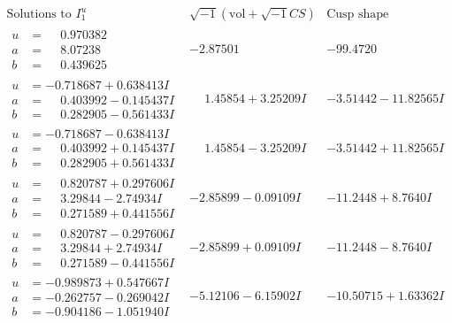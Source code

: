 \documentclass[1p]{elsarticle_modified}
\theoremstyle{definition}
\newcommand{\I}{\sqrt{-1}}
\begin{document}
$$\begin{array}{c|c|c}  
\text{Solutions to }I^u_{1}& \I (\text{vol} + \sqrt{-1}CS) & \text{Cusp shape}\\
 \hline 
\begin{aligned}
u &= \phantom{-}0.970382\phantom{ +0.000000I} \\
a &= \phantom{-}8.07238\phantom{ +0.000000I} \\
b &= \phantom{-}0.439625\phantom{ +0.000000I}\end{aligned}
 & -2.87501\phantom{ +0.000000I} & -99.4720\phantom{ +0.000000I} \\ \hline\begin{aligned}
u &= -0.718687 + 0.638413 I \\
a &= \phantom{-}0.403992 - 0.145437 I \\
b &= \phantom{-}0.282905 - 0.561433 I\end{aligned}
 & \phantom{-}1.45854 + 3.25209 I & -3.51442 - 11.82565 I \\ \hline\begin{aligned}
u &= -0.718687 - 0.638413 I \\
a &= \phantom{-}0.403992 + 0.145437 I \\
b &= \phantom{-}0.282905 + 0.561433 I\end{aligned}
 & \phantom{-}1.45854 - 3.25209 I & -3.51442 + 11.82565 I \\ \hline\begin{aligned}
u &= \phantom{-}0.820787 + 0.297606 I \\
a &= \phantom{-}3.29844 - 2.74934 I \\
b &= \phantom{-}0.271589 + 0.441556 I\end{aligned}
 & -2.85899 - 0.09109 I & -11.2448 + 8.7640 I \\ \hline\begin{aligned}
u &= \phantom{-}0.820787 - 0.297606 I \\
a &= \phantom{-}3.29844 + 2.74934 I \\
b &= \phantom{-}0.271589 - 0.441556 I\end{aligned}
 & -2.85899 + 0.09109 I & -11.2448 - 8.7640 I \\ \hline\begin{aligned}
u &= -0.989873 + 0.547667 I \\
a &= -0.262757 - 0.269042 I \\
b &= -0.904186 - 1.051940 I\end{aligned}
 & -5.12106 - 6.15902 I & -10.50715 + 1.63362 I \\ \hline\begin{aligned}

\end{aligned}
\end{array}$$
\end{document}
